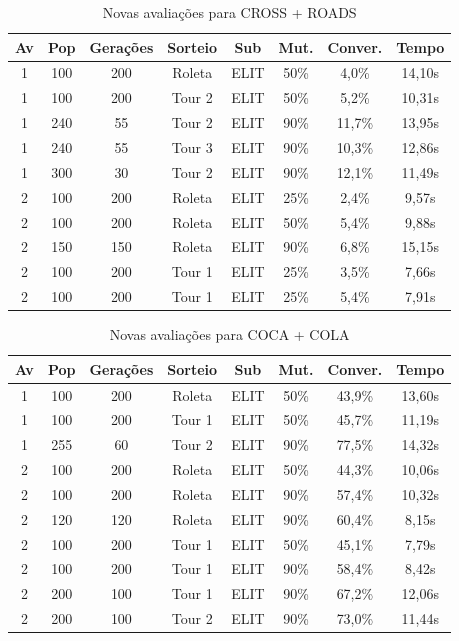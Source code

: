 \documentclass[a4paper, 12pt]{article}
\begin{document}
  \begin{table}[h]
    \centering
    \begin{tabular}{|c|c|c|c|c|c|c|c|}
      \hline
      Av & Pop & Gerações & Sorteio & Sub & Mut. & Conver. & Tempo  \\
      \hline
      1 & 100 & 200 & Roleta & ELIT & 50\% &4,0\% & 14,10s \\
      \hline
      1 & 100 & 200 & Tour 2 & ELIT & 50\% &5,2\% & 10,31s \\
      \hline
      1 & 240 & 55 & Tour 2 & ELIT & 90\% &11,7\% & 13,95s \\
      \hline
      1 & 240 & 55 & Tour 3 & ELIT & 90\% &10,3\% & 12,86s \\
      \hline
      1 & 300 & 30 & Tour 2 & ELIT & 90\% &12,1\% & 11,49s \\
      \hline
      2 & 100 & 200 & Roleta & ELIT & 25\% &2,4\% & 9,57s \\
      \hline
      2 & 100 & 200 & Roleta & ELIT & 50\% &5,4\% & 9,88s \\
      \hline
      2 & 150 & 150 & Roleta & ELIT & 90\% &6,8\% & 15,15s \\
      \hline
      2 & 100 & 200 & Tour 1 & ELIT & 25\% &3,5\% & 7,66s \\
      \hline
      2 & 100 & 200 & Tour 1 & ELIT & 25\% &5,4\% & 7,91s \\
      \hline
    \end{tabular}
    \caption{Novas avaliações para CROSS + ROADS}
    \label{tab:cross}
  \end{table}

  \begin{table}[h]
    \centering
    \begin{tabular}{|c|c|c|c|c|c|c|c|}
      \hline
      Av & Pop & Gerações & Sorteio & Sub & Mut. & Conver. & Tempo  \\
      \hline
      1 & 100 & 200 & Roleta & ELIT & 50\% &43,9\% & 13,60s\\
      \hline
      1& 100 & 200 & Tour 1 & ELIT & 50\% &45,7\% & 11,19s\\
      \hline
      1& 255 & 60 & Tour 2 & ELIT & 90\% &77,5\% & 14,32s\\
      \hline
      2& 100 & 200 & Roleta & ELIT & 50\% &44,3\% & 10,06s\\
      \hline
      2& 100 & 200 & Roleta & ELIT & 90\% &57,4\% & 10,32s\\
      \hline
      2& 120 & 120 & Roleta & ELIT & 90\% &60,4\% & 8,15s\\
      \hline
      2& 100 & 200 & Tour 1 & ELIT & 50\% &45,1\% & 7,79s\\
      \hline
      2& 100 & 200 & Tour 1 & ELIT & 90\% &58,4\% & 8,42s\\
      \hline
      2& 200 & 100 & Tour 1 & ELIT & 90\% &67,2\% & 12,06s\\
      \hline
      2& 200 & 100 & Tour 2 & ELIT & 90\% &73,0\% & 11,44s\\
      \hline
    \end{tabular}
    \caption{Novas avaliações para COCA + COLA}
    \label{tab:coca}
  \end{table}
\end{document}
